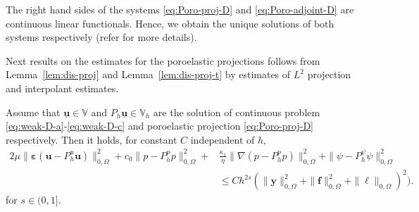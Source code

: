 \documentclass[smallextended]{svjour3}
\numberwithin{equation}{section}
\numberwithin{figure}{section}
\numberwithin{table}{section}
\newcommand\bV{\mathbf{V}}
\newcommand\ff{\boldsymbol{f}}
\newcommand\beps{\boldsymbol{\varepsilon}}
\newcommand\buu{\underline{\boldsymbol{u}}}
\newcommand\by{\boldsymbol{y}}
\newcommand\bu{\boldsymbol{u}}
\newcommand{\bbV}{\mathbb{V}}
\begin{document}
	The right hand sides of the systems \eqref{eq:Poro-proj-D} and \eqref{eq:Poro-adjoint-D} are continuous linear functionals. Hence, we obtain the unique solutions of both systems respectively (refer \cite{burger_acom21} for more details).
	
	 Next results on the estimates for the poroelastic projections follows from Lemma~\ref{lem:dis-proj} and Lemma~\ref{lem:dis-proj-t} by estimates of $L^2$ projection and interpolant estimates.
	\begin{corollary} \label{lem:proj}
		Assume that $\buu \in \bbV$ and $P_h \buu \in \bbV_h$ are the solution of continuous problem  \eqref{eq:weak-D-a}-\eqref{eq:weak-D-c} and poroelastic projection \eqref{eq:Poro-proj-D} respectively.
		 Then it holds, for constant $C$ independent of $h$,
		\begin{equation}\label{est:proj-D}
			\begin{aligned} 
			2 \mu \| \beps(\bu - P_h^u \bu) \|_{0, \Omega}^2  + c_0 \| p - P_h^p p \|_{0, \Omega}^2 +& \frac{\kappa_1}{\eta} \| \nabla (p - P_h^p p)\|_{0, \Omega}^2+ \| \psi - P_h^{\psi} \psi \|_{0, \Omega}^2 \\
			& \le C h^{2s} ( \|\by \|_{0, \Omega}^2
			+ \|\ff \|_{0, \Omega}^2 + \|\ell\|_{0, \Omega})^2).
		\end{aligned}
	\end{equation}
	for $s \in (0,1]$.
	\end{corollary}
    
\end{document}
